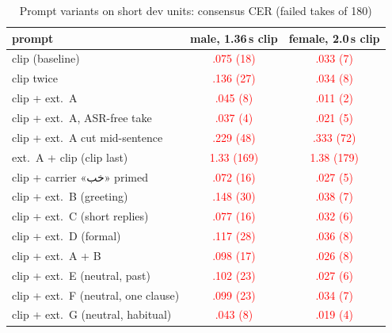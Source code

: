 \documentclass[conference]{IEEEtran}
\newcommand{\fa}[1]{{\persianfont\beginR #1\endR}}
\newcommand{\RES}[1]{\textcolor{red}{#1}}
\begin{document}
\begin{table}[t]
\caption{Prompt variants on short dev units: consensus CER (failed takes of 180)}\label{tab:mech}
\centering
\setlength{\tabcolsep}{4pt}
\begin{tabular}{lcc}
\toprule
prompt & male, 1.36\,s clip & female, 2.0\,s clip \\
\midrule
clip (baseline) & \RES{.075 (18)} & \RES{.033 (7)} \\
clip twice & \RES{.136 (27)} & \RES{.034 (8)} \\
clip + ext.\ A & \RES{.045 (8)} & \RES{.011 (2)} \\
clip + ext.\ A, ASR-free take & \RES{.037 (4)} & \RES{.021 (5)} \\
clip + ext.\ A cut mid-sentence & \RES{.229 (48)} & \RES{.333 (72)} \\
ext.\ A + clip (clip last) & \RES{1.33 (169)} & \RES{1.38 (179)} \\
clip + carrier \fa{«خب»} primed & \RES{.072 (16)} & \RES{.027 (5)} \\
clip + ext.\ B (greeting) & \RES{.148 (30)} & \RES{.038 (7)} \\
clip + ext.\ C (short replies) & \RES{.077 (16)} & \RES{.032 (6)} \\
clip + ext.\ D (formal) & \RES{.117 (28)} & \RES{.036 (8)} \\
clip + ext.\ A + B & \RES{.098 (17)} & \RES{.026 (8)} \\
clip + ext.\ E (neutral, past) & \RES{.102 (23)} & \RES{.027 (6)} \\
clip + ext.\ F (neutral, one clause) & \RES{.099 (23)} & \RES{.034 (7)} \\
clip + ext.\ G (neutral, habitual) & \RES{.043 (8)} & \RES{.019 (4)} \\
\bottomrule
\end{tabular}
\end{table}
\end{document}
